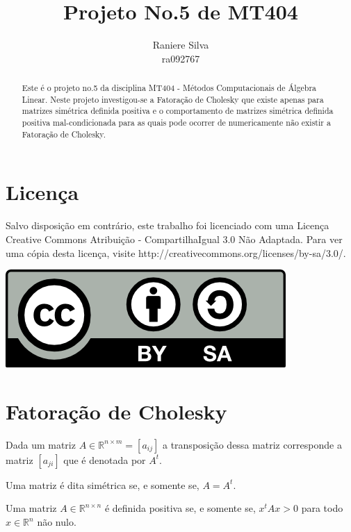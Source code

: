 \documentclass[12pt,a4paper]{article}
\begin{document}
\title{Projeto No.5 de MT404}
\author{Raniere Silva \\ ra092767}
\maketitle
\begin{abstract}
    Este \'{e} o projeto no.5 da disciplina MT404 - M\'{e}todos Computacionais
    de \'{A}lgebra Linear. Neste projeto investigou-se a Fatoração de Cholesky
    que existe apenas para matrizes simétrica definida positiva e o
    comportamento de matrizes simétrica definida positiva mal-condicionada
    para as quais pode ocorrer de numericamente não existir a Fatoração de
    Cholesky.
\end{abstract}
\tableofcontents
\lstlistoflistings
\section*{Licen\c{c}a}
Salvo disposi\c{c}\~{a}o em contr\'{a}rio, este trabalho foi licenciado com uma
Licen\c{c}a Creative Commons Atribui\c{c}\~{a}o - CompartilhaIgual 3.0 N\~{a}o
Adaptada. Para ver uma c\'{o}pia desta licen\c{c}a, visite
http://creativecommons.org/licenses/by-sa/3.0/.
\begin{center}
    \includegraphics{../figuras/cc-by-sa.png}
\end{center}
\newpage
\section{Fatora\c{c}\~{a}o de Cholesky}
\begin{defi}[Transposição]
    Dada um matriz $A \in \mathbb{R}^{n \times m} = [a_{ij}]$ a transposição
    dessa matriz corresponde a matriz $[a_{ji}]$ que é denotada por $A^t$.
\end{defi}
\begin{defi}
    Uma matriz é dita simétrica se, e somente se, $A = A^t$.
\end{defi}
\begin{defi}
    Uma matriz $A \in \mathbb{R}^{n \times n}$ é definida positiva se, e somente
    se, $x^t A x > 0$ para todo $x \in \mathbb{R}^n$ não nulo.
\end{defi}
\end{document}
